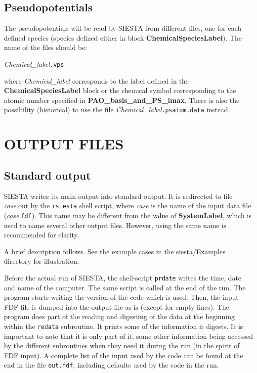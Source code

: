 \subsection{Pseudopotentials}

The pseudopotentials will be read by SIESTA from different files, one
for each defined species (species defined either in block
{\bf ChemicalSpeciesLabel}).
The name of the files should be:

{\it Chemical\_label}{\tt .vps}

\noindent 
where {\it Chemical\_label} corresponds to the label defined in the
{\bf ChemicalSpeciesLabel} block or the chemical symbol corresponding to
the atomic number specified in {\bf PAO\_basis\_and\_PS\_lmax}.
There is also the possibility (historical) to use the file 
{\it Chemical\_label}{\tt .psatom.data} instead.


        
\section{OUTPUT FILES}

\subsection{Standard output} 

SIESTA writes its main output into standard output. 
It is redirected to file {\it case}.out by the {\tt rsiesta} shell script, 
where {\it case} is the name of the input data file ({\it case}.{\tt fdf}). 
This name may be different from the value of {\bf SystemLabel}, 
which is used to name several other output files.
However, using the same name is recommended for clarity.

A brief description follows. See the example cases in the 
siesta/Examples directory for illustration. 

Before the actual run of SIESTA, the shell-script {\tt prdate} writes 
the time, date and name of the computer. The same script is called
at the end of the run. The program starts writing the version of
the code which is used. Then, the input FDF file is dumped into
the output file as is (except for empty lines). The program does
part of the reading and digesting of the data at the beginning
within the {\tt redata} subroutine. It prints some of the information
it digests. It is important to note that it is only part of it,
some other information being accessed by the different subroutines
when they need it during the run (in the spirit of FDF input).
A complete list of the input used by the code can be found at the
end in the file {\tt out.fdf}, including defaults used by the code
in the run.


